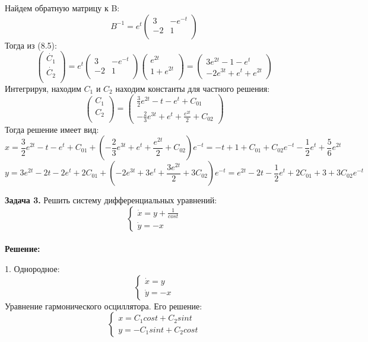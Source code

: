 \documentclass[10pt]{report}
\begin{document}
Найдем обратную матрицу к B:
\[ B^{-1}=
e^{t}\left(
\begin{array}{cc}
3 & -e^{-t}\\
-2 & 1\\
\end{array}
\right)\]
Тогда из (8.5):
\[
\left(
\begin{array}{c}
\dot{C_1}\\
\dot{C_2}\\
\end{array}
\right)=
e^{t}\left(
\begin{array}{cc}
3 & -e^{-t}\\
-2 & 1\\
\end{array}
\right)
\left(
\begin{array}{c}
e^{2t}\\
1+e^{2t}\\
\end{array}
\right)=
\left(
\begin{array}{c}
3e^{2t}-1-e^t\\
-2e^{3t}+e^t+e^{2t}
\end{array}
\right)
\]
Интегрируя, находим $C_1$ и $C_2$ находим константы для частного решения:
\[
\left(
\begin{array}{c}
C_1\\
C_2\\
\end{array}
\right)=
\left(
\begin{array}{c}
\frac 3 2 e^{2t}-t-e^t+C_{01}\\
-\frac 2 3e^{3t}+e^t+\frac {e^{2t}} 2 +C_{02}
\end{array}
\right)\]
Тогда решение имеет вид:
\[x = \frac 3 2 e^{2t}-t-e^t+C_{01}+\left( -\frac 2 3e^{3t}+e^t+\frac {e^{2t}} 2 +C_{02}\right)e^{-t}=-t+1+C_{01}+C_{02}e^{-t}-\frac 1 2 e^t+\frac 5 6e^{2t}\]
\[y =  3 e^{2t}-2t-2e^t+2C_{01}+\left( -2 e^{3t}+3e^t+\frac {3e^{2t}} 2 +3C_{02}\right)e^{-t}=e^{2t}-2t-\frac 1 2 e^t+2C_{01}+3+3C_{02}e^{-t}\]

\textbf{Задача 3.} Решить систему дифференциальных уравнений: 
\begin{equation}
\left\{
\begin{array}{lr}
\dot{x} = y+\frac 1 {cost}\\
\dot{y} = -x
\end{array}
\right.
\end{equation}\\
\textbf{Решение:}

1. Однородное:
\[
\left\{
\begin{array}{lr}
\dot{x} = y\\
\dot{y} = -x
\end{array}
\right.
\]
Уравнение гармонического осциллятора. Его решение:
\[
\left\{
\begin{array}{lr}
x =C_1cost+C_2sint\\
y=-C_1sint+C_2cost
\end{array}
\right.
\]
\end{document}
